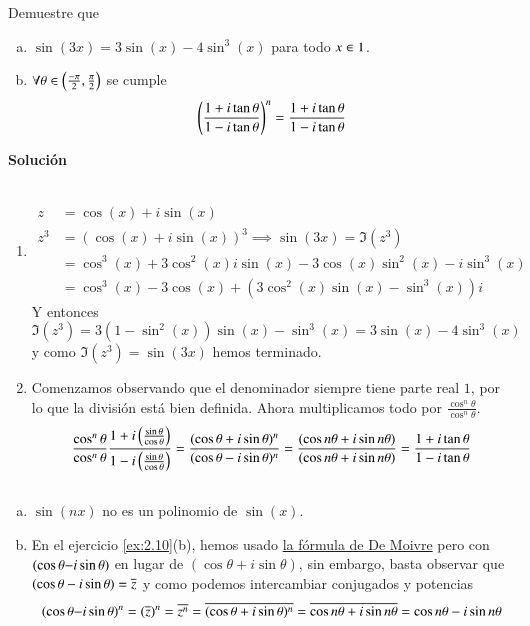     \begin{ex}[H2.10]\label{ex:2.10}Demuestre que\\
        \begin{enumerate}[a)]
            \item $\sin(3x) = 3\sin(x) - 4\sin^3(x)$ para todo $x \in 1$.
            \item $\forall \theta \in \px{\frac{-\pi}{2}, \frac{\pi}{2}}$ se cumple
            $$
                \left(\frac{1+i\tan \theta}{1 - i \tan \theta}\right)^n = \frac{1 + i\tan \theta}{1 - i \tan \theta}
            $$
        \end{enumerate}
        \textbf{Solución}\\\\
        \begin{enumerate}
            \item
            \begin{align*}
                z &= \cos(x) + i \sin(x)\\
                z^3 &= (\cos(x) + i\sin(x))^3 \implies \sin(3x) = \Im(z^3)\\
                    &= \cos^3(x) + 3\cos^2(x) i \sin(x) - 3 \cos(x)\sin^2(x) - i \sin^3(x)\\
                    &= \cos^3(x)-3\cos(x)+(3\cos^2(x)\sin( x) - \sin^3(x))i
            \end{align*}
            Y entonces $\Im(z^3) = 3(1 - \sin^2(x))\sin(x) - \sin^3(x) = 3 \sin(x) - 4 \sin^3(x)$ y como $\Im(z^3) = \sin(3x)$ hemos terminado.
            \item Comenzamos observando que el denominador siempre tiene parte real $1$, por lo que la división está bien definida. Ahora multiplicamos todo por $\frac{\cos^n \theta}{\cos^n \theta}$.
            \begin{align*}
                \frac{\cos^n \theta}{\cos^n \theta} \frac{1 + i\left(\frac{\sin \theta}{\cos \theta}\right)}{1 - i\left(\frac{\sin \theta}{\cos \theta}\right)} = \frac{(\cos \theta + i \sin \theta)^n}{(\cos \theta - i \sin \theta)^n} = \frac{(\cos n\theta + i \sin n\theta)}{(\cos n\theta + i \sin n\theta)} = \frac{1 + i\tan \theta}{1 - i \tan \theta}
            \end{align*}
        \end{enumerate}
    \end{ex}

    \begin{obs}$ $
        \begin{enumerate}[a)]
            \item $\sin(nx)$ no es un polinomio de $\sin(x)$.
            \item En el ejercicio \ref{ex:2.10}(b), hemos usado \hyperref[eg:DeMoivre]{la fórmula de De Moivre} pero con $(\cos \theta \mathbf{-} i \sin \theta)$ en lugar de $(\cos \theta + i \sin \theta)$, sin embargo, basta observar que $(\cos \theta - i \sin \theta) = \overline{z}$ y como podemos intercambiar conjugados y potencias
            $$(\cos \theta \mathbf{-} i \sin \theta)^n = (\overline{z})^n = \overline{z^n} = \overline{(\cos \theta + i \sin \theta)^n} = \overline{\cos n\theta + i \sin n\theta} = \cos n\theta - i \sin n\theta$$
        \end{enumerate}
    \end{obs}

